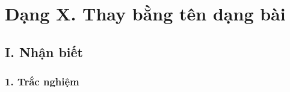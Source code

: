 
\section*{Dạng X. Thay bằng tên dạng bài}
\setcounter{ex}{0}

\subsection*{I. Nhận biết}

\subsubsection*{1. Trắc nghiệm}


